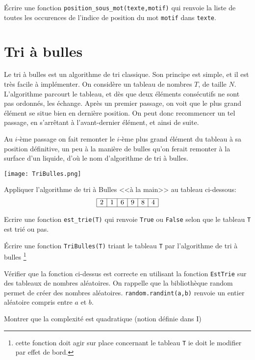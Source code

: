 \q \'Ecrire une fonction \texttt{position\_sous\_mot(texte,motif)} qui renvoie la liste de toutes les occurences de l'indice de position du mot \texttt{motif} dans \texttt{texte}.

\ee

\section{Tri à bulles}


Le tri à bulles est un algorithme de tri classique. Son principe est simple, et il est très
facile à implémenter.
On considère un tableau de nombres $T$, de taille $N$. L'algorithme parcourt le tableau, et dès que deux éléments consécutifs ne sont pas ordonnés, les échange. Après un premier passage, on voit que le plus grand élément se situe bien en dernière position. On peut donc recommencer un tel passage, en s'arrêtant à l'avant-dernier élément, et ainsi de suite.

Au $i$-ème passage on fait remonter le $i$-ème plus grand élément du tableau à sa position définitive, un peu à la manière de bulles qu'on ferait remonter à la surface d'un liquide, d'où le nom d'algorithme de tri à bulles.

\begin{center}
    \texttt{[image: TriBulles.png]}
\end{center}

\be\q Appliquer l'algorithme de tri à Bulles <<à la main>> au tableau ci-dessous: $$\begin{array}{|c|c|c|c|c|c|}
    \hline2& 1 & 6 & 9 & 8 & 4 \\
    \hline\end{array}$$

\q Ecrire une fonction \texttt{est\_trie(T)} qui renvoie \texttt{True} ou \texttt{False} selon que le tableau \texttt{T} est trié ou pas.

\q Écrire une fonction \texttt{TriBulles(T)} triant le tableau \texttt{T} par l'algorithme de tri à
bulles \footnote{cette fonction doit agir sur place concernant le tableau \texttt{T} ie doit le modifier par effet de bord.}


\q Vérifier que la fonction ci-dessus est correcte en utilisant la fonction \texttt{EstTrie} sur des  tableaux de nombres aléatoires. On rappelle que la bibliothèque random permet de créer des nombres aléatoires. \texttt{random.randint(a,b)} renvoie un entier aléatoire compris entre $a$ et $b$.

\q Montrer que la complexité est quadratique (notion définie dans I)

